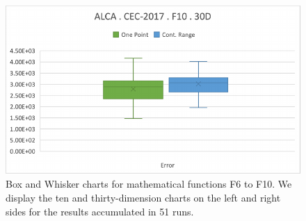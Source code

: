 \documentclass[graybox]{svmult}
\begin{document}
\begin{figure}[!ht]
\begin{minipage}[h]{0.49\linewidth}
        \end{minipage}
        \hfill
        \begin{minipage}[h]{0.49\linewidth}
            \includegraphics[width=1\linewidth]{img/fig_experiment_F10x30D.pdf} 
        \end{minipage}
        
        \caption{Box and Whisker charts for mathematical functions F6 to F10. We display the ten and thirty-dimension charts on the left and right sides for the results accumulated in 51 runs.} \label{fig.experiment_F6-F10}
    \end{figure}

    \FloatBarrier
\end{document}
